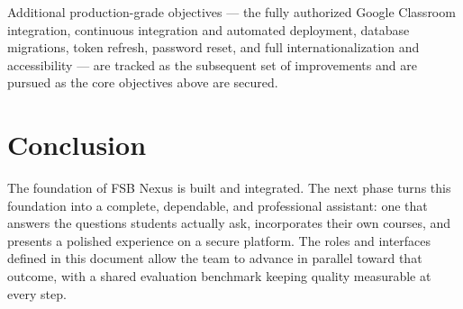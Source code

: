 \documentclass[11pt,a4paper]{article}
\begin{document}
Additional production-grade objectives --- the fully authorized Google Classroom
integration, continuous integration and automated deployment, database migrations,
token refresh, password reset, and full internationalization and accessibility --- are
tracked as the subsequent set of improvements and are pursued as the core objectives
above are secured.

\section{Conclusion}

The foundation of FSB Nexus is built and integrated. The next phase turns this
foundation into a complete, dependable, and professional assistant: one that answers
the questions students actually ask, incorporates their own courses, and presents a
polished experience on a secure platform. The roles and interfaces defined in this
document allow the team to advance in parallel toward that outcome, with a shared
evaluation benchmark keeping quality measurable at every step.
\end{document}
